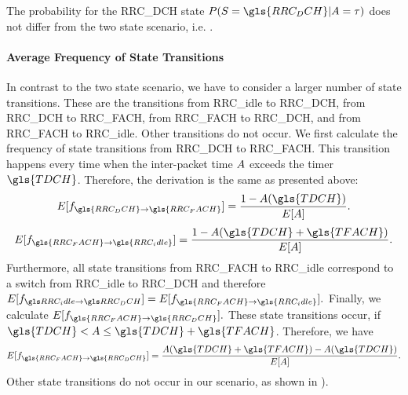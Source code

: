 The probability for the \gls{RRC_DCH} state \(P(\RRCState=\gls{RRC_DCH} \vert \PacketIAT = \ObservationIntervalLength)\) does not differ from the two state scenario, i.e. .

\paragraph*{Average Frequency of State Transitions}

\newcommand{\fStateTransitionsDCHToFACH}{f_{\gls{RRC_DCH}\rightarrow\gls{RRC_FACH}}}
\newcommand{\fStateTransitionsFACHToIdle}{f_{\gls{RRC_FACH}\rightarrow\gls{RRC_idle}}}
\newcommand{\fStateTransitionsFACHToDCH}{f_{\gls{RRC_FACH}\rightarrow\gls{RRC_DCH}}}

In contrast to the two state scenario, we have to consider a larger number of state transitions. These are the transitions from \gls{RRC_idle} to \gls{RRC_DCH}, from \gls{RRC_DCH} to \gls{RRC_FACH}, from \gls{RRC_FACH} to \gls{RRC_DCH}, and from \gls{RRC_FACH} to \gls{RRC_idle}.
Other transitions do not occur.
We first calculate the frequency of state transitions from \gls{RRC_DCH} to \gls{RRC_FACH}.
This transition happens every time when the inter-packet time \(A\) exceeds the timer \(\gls{TDCH}\).
Therefore, the derivation is the same as presented above:
\begin{equation*}
E[\fStateTransitionsDCHToFACH]=\frac{1-\PacketIAT(\gls{TDCH})}{E[\PacketIAT]}.
\end{equation*}
\begin{equation*}
E[\fStateTransitionsFACHToIdle]=\frac{1-\PacketIAT(\gls{TDCH}+\gls{TFACH})}{E[\PacketIAT]}.
\end{equation*}
Furthermore, all state transitions from \gls{RRC_FACH} to \gls{RRC_idle} correspond to a switch from \gls{RRC_idle} to \gls{RRC_DCH} and therefore 
\(E[\fStateTransitionsIdleToDCH]=E[\fStateTransitionsFACHToIdle].\)
Finally, we calculate \(E[\fStateTransitionsFACHToDCH].\)
These state transitions occur, if \(\gls{TDCH}<\PacketIAT \leq \gls{TDCH}+\gls{TFACH}\).
Therefore, we have 
\begin{equation*}
E[\fStateTransitionsFACHToDCH]=\frac{\PacketIAT(\gls{TDCH}+\gls{TFACH})-\PacketIAT(\gls{TDCH})}{E[\PacketIAT]}.
\end{equation*}
Other state transitions do not occur in our scenario, as shown in ).

